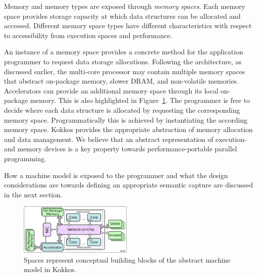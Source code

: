 Memory and memory types are exposed through \emph{memory spaces}. Each memory space provides storage capacity at which data structures can be allocated and accessed. Different memory space types have different characteristics with respect to accessibility from execution spaces and performance. 

An instance of a memory space provides a concrete method for the application programmer to request data storage allocations. Following the architecture, as discussed earlier, the multi-core processor may contain multiple memory spaces that abstract on-package memory, slower DRAM, and non-volatile memories. Accelerators can provide an additional memory space through its local on-package memory. This is also highlighted in Figure~\ref{fig:spaces}. The programmer is free to decide where each data structure is allocated by requesting the corresponding memory space. Programmatically this is achieved by instantiating the according memory space. Kokkos provides the appropriate abstraction of memory allocation and data management. We believe that an abstract representation of execution- and memory devices is a key property towards performance-portable parallel programming.

How a machine model is exposed to the programmer and what the design considerations are towards defining an appropriate semantic capture are discussed in the next section.


\begin{figure}[t!]

\includegraphics[width=0.49\textwidth]{img/KokkosSpaces.png}
\centering
\caption{Spaces represent conceptual building blocks of the abstract machine model in Kokkos.}
\label{fig:execspace}
\label{fig:spaces}
\end{figure}
